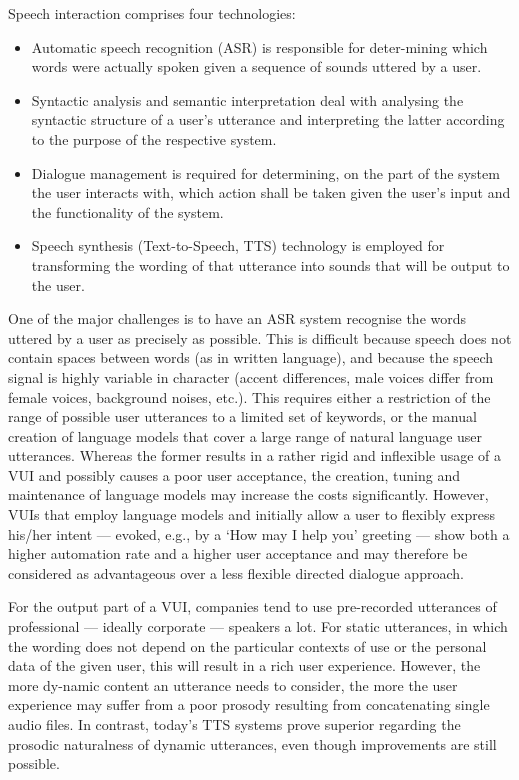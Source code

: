 \documentclass{scrartcl}
\begin{document}
\begin{Parallel}[c]{70mm}{70mm}
{    Speech interaction comprises four technologies:
    \begin{itemize}
    \item Automatic speech recognition (ASR) is responsible for deter-mining which words were actually spoken given a sequence of sounds uttered by a user.
 	\item Syntactic analysis and semantic interpretation deal with analysing the syntactic structure of a user's utterance and interpreting the latter according to the purpose of the respective system.
 	\item Dialogue management is required for determining, on the part of the system the user interacts with, which action shall be taken given the user's input and the functionality of the system.
 	\item Speech synthesis (Text-to-Speech, TTS) technology is employed for transforming the wording of that utterance into sounds that will be output to the user.
    \end{itemize}

    One of the major challenges is to have an ASR system recognise the words uttered by a user as precisely as possible. This is difficult because speech does not contain spaces between words (as in written language), and because the speech signal is highly variable in character (accent differences, male voices differ from female voices, background noises, etc.).  This requires either a restriction of the range of possible user utterances to a limited set of keywords, or the manual creation of language models that cover a large range of natural language user utterances. Whereas the former results in a rather rigid and inflexible usage of a VUI and possibly causes a poor user acceptance, the creation, tuning and maintenance of language models may increase the costs significantly. However, VUIs that employ language models and initially allow a user to flexibly express his/her intent --- evoked, e.g., by a `How may I help you' greeting --- show both a higher automation rate and a higher user acceptance and may therefore be considered as advantageous over a less flexible directed dialogue approach.

    For the output part of a VUI, companies tend to use pre-recorded utterances of professional --- ideally corporate --- speakers a lot. For static utterances, in which the wording does not depend on the particular contexts of use or the personal data of the given user, this will result in a rich user experience. However, the more dy-namic content an utterance needs to consider, the more the user experience may suffer from a poor prosody resulting from concatenating single audio files. In contrast, today's TTS systems prove superior regarding the prosodic naturalness of dynamic utterances, even though improvements are still possible.

}
\end{Parallel}
\end{document}

